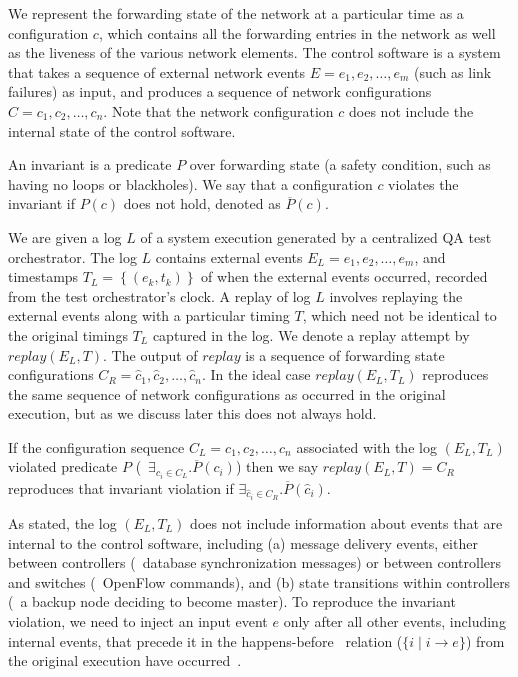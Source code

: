 
We represent the forwarding state of the network
at a particular time as a configuration $c$, which contains all the forwarding
entries in the network
as well as the liveness of the various network elements.
The control software is a system %
that takes a sequence of
external network events $E = e_1,e_2,\dots,e_m$ (such as link failures) as input,
and produces a sequence of network configurations
$C = c_1,c_2,\dots,c_n$. Note that the network configuration $c$ does not
include the internal state of the control software.

An invariant is a predicate $P$ over forwarding state (a safety
condition, such as having no loops or blackholes). We say that a configuration
$c$ violates the invariant if $P(c)$ does not
hold, denoted as $\overline{P}(c)$.

 We are given a log $L$ of a system execution generated
by a centralized QA test orchestrator. The log $L$ contains external
events $E_L = e_1,e_2,\dots,e_m$, and
timestamps $T_L = \left\{ (e_k, t_k) \right\}$ of when the external events
occurred, recorded from the test orchestrator's clock.
A replay of log $L$ involves replaying the external events along with a
particular timing $T$,
which need not be identical to the original timings $T_L$ captured in the
log. We
denote a replay attempt by $replay(E_L,T)$.
The output of $replay$ is a sequence of forwarding state configurations
$C_R = \hat{c}_1,\hat{c}_2,\dots,\hat{c}_n$. In the ideal case $replay(E_L,T_L)$ reproduces the same
sequence of network configurations as occurred in the original execution, but as we discuss later
this does not always hold.

If the configuration sequence $C_L = c_1,c_2,\dots,c_n$ associated with the log $(E_L, T_L)$ violated predicate $P$
(\ie~$\exists_{c_i \in C_L}. \overline{P}(c_i)$)
then we say $replay(E_L,T) = C_R$ reproduces that invariant violation if
$\exists_{\hat{c}_i \in C_R}. \overline{P}(\hat{c}_i)$.

 As stated, the log $(E_L, T_L)$ does not include
information about events that are internal to the control software, including
(a) message delivery events, either between controllers (\eg~database
synchronization messages) or
between controllers and switches (\eg~OpenFlow commands), and (b) state transitions
within controllers (\eg~a backup node deciding to become master).
To reproduce the invariant violation,
we need to inject an input event $e$ only after all other
events, including internal events,
that precede it in the
happens-before~\cite{Lamport:1978:TCO:359545.359563}
relation ($\{i \mid i \rightarrow e\}$) from the original execution have
occurred~\cite{tel2000introduction}.

